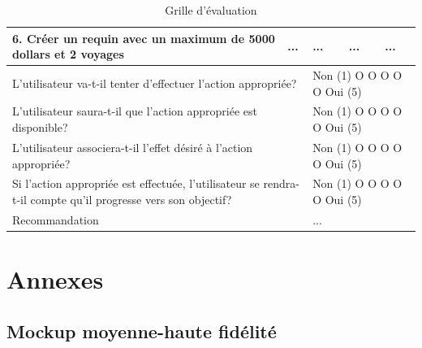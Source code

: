 \documentclass{article}
\begin{document}
\begin{table}[h]
\begin{tabular}{|p{6cm}|p{1.5cm}|p{1.5cm}|p{2.5cm}|p{3.5cm}|}
		\textbf{6. Créer un requin avec un maximum de 5000 dollars et 2 voyages}                                                                  & ...                                                   & ...              & ...                                      & ...                   \\ \hline
		\multicolumn{2}{|p{7.5cm}|}{L’utilisateur va-t-il tenter d’effectuer l’action appropriée?}                                                & \multicolumn{3}{p{7.5cm}|}{Non (1) O O O O O Oui (5)}                                                                                       \\ \hline
		\multicolumn{2}{|p{7.5cm}|}{L’utilisateur saura-t-il que l’action appropriée est disponible?}                                             & \multicolumn{3}{p{7.5cm}|}{Non (1) O O O O O Oui (5)}                                                                                       \\ \hline
		\multicolumn{2}{|p{7.5cm}|}{L’utilisateur associera-t-il l’effet désiré à l’action appropriée?}                                           & \multicolumn{3}{p{7.5cm}|}{Non (1) O O O O O Oui (5)}                                                                                       \\ \hline
		\multicolumn{2}{|p{7.5cm}|}{Si l’action appropriée est effectuée, l’utilisateur se rendra-t-il compte qu’il progresse vers son objectif?} & \multicolumn{3}{p{7.5cm}|}{Non (1) O O O O O Oui (5)}                                                                                       \\ \hline
		\multicolumn{2}{|p{7.5cm}|}{Recommandation}                                                                                               & \multicolumn{3}{p{7.5cm}|}{...}                                                                                                             \\ \hline
	\end{tabular}
	\caption{Grille d'évaluation}
	\label{grille_evaluation}
\end{table}
\FloatBarrier

\newpage
\section{Annexes}

\subsection{Mockup moyenne-haute fidélité}
\end{document}
